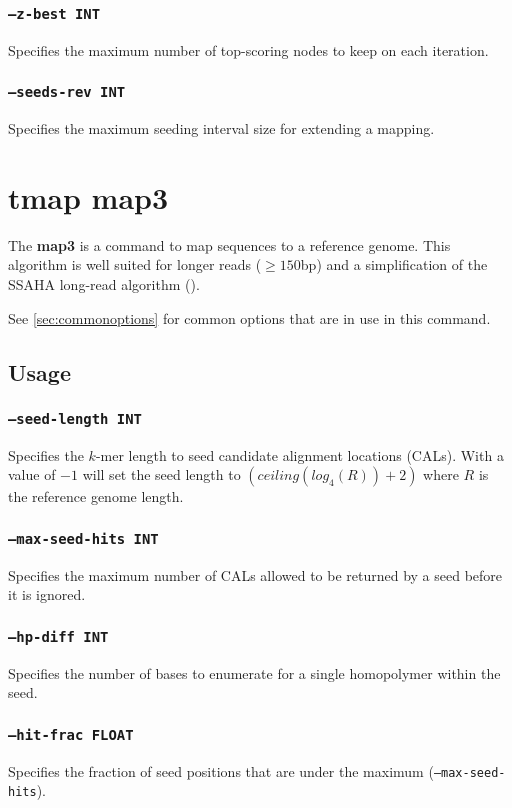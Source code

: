 \documentclass[a4paper,12pt]{book}
\newcommand{\TT}[1]{{\tt #1}} %
\newcommand{\BF}[1]{{\bf #1}} %
\begin{document}
\subsubsection{\TT{--z-best INT}}
Specifies the maximum number of top-scoring nodes to keep on each iteration.

\subsubsection{\TT{--seeds-rev INT}}
Specifies the maximum seeding interval size for extending a mapping.

\section{tmap map3}
\label{sec:map3}
The \BF{map3} is a command to map sequences to a reference genome.
This algorithm is well suited for longer reads ($\geq 150$bp) and a simplification of the SSAHA long-read algorithm (\cite{SSAHA}).

See \autoref{sec:commonoptions} for common options that are in use in this command.

\subsection{Usage}

\subsubsection{\TT{--seed-length INT}}
Specifies the $k$-mer length to seed candidate alignment locations (CALs).
With a value of $-1$ will set the seed length to $\left(ceiling(log_4(R)) + 2\right)$ where $R$ is the reference genome length.

\subsubsection{\TT{--max-seed-hits INT}}
Specifies the maximum number of CALs allowed to be returned by a seed before it is ignored.

\subsubsection{\TT{--hp-diff INT}}
Specifies the number of bases to enumerate for a single homopolymer within the seed.

\subsubsection{\TT{--hit-frac FLOAT}}
Specifies the fraction of seed positions that are under the maximum (\TT{--max-seed-hits}).
\end{document}
